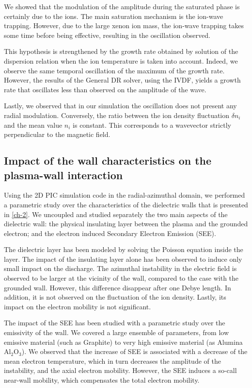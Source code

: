 We showed that the modulation of the amplitude during the saturated phase is certainly due to the ions.
The main saturation mechanism is the ion-wave trapping.
However, due to the large xenon ion mass, the ion-wave trapping takes some time before being effective, resulting in the oscillation observed.

This hypothesis is strengthened by the growth rate obtained by solution of the dispersion relation when the ion temperature is taken into account.
Indeed, we observe the same temporal oscillation of the maximum of the  growth rate.
However, the results of the General DR solver, using the IVDF, yields a growth rate that oscillates less than observed on the amplitude of the wave.

Lastly, we observed that in our simulation the oscillation does not present any radial modulation.
Conversely, the ratio between the ion density fluctuation $\delta n_i$ and the mean value $n_i$ is constant. 
This corresponds to a wavevector strictly perpendicular to the magnetic field.


\subsection{Impact of the wall characteristics on the plasma-wall interaction }
Using the 2D PIC simulation code in the radial-azimuthal domain, we performed a parametric study over the characteristics of the dielectric walls that is presented in \cref{ch-2}.
We uncoupled and studied separately the two main aspects of the dielectric wall\string: the physical insulating layer between the plasma and the grounded electron; and the electron induced Secondary Electron Emission (SEE).

The dielectric layer has been modeled by solving the Poisson equation inside the layer.
The impact of the insulating layer alone has been observed to induce only small impact on the discharge.
The azimuthal instability in the electric field is observed to be larger at the vicinity of the wall, compared to the case with the grounded wall.
However, this difference disappear after one Debye length.
In addition, it is not observed on the fluctuation of the ion density.
Lastly, its impact on the electron mobility is not significant.

The impact of the SEE has been studied with a parametric study over the emissivity of the wall.
We covered a large ensemble of parameters, from low emissive material (such as Graphite) to very high emissive material (as Alumina Al$_2$O$_3$).
We observed that the increase of SEE is associated with a decrease of the mean electron temperature, which in turn decreases the amplitude of the instability, and the axial electron mobility.
However, the SEE induces a so-call near-wall mobility, which compensates the total electron  mobility.

